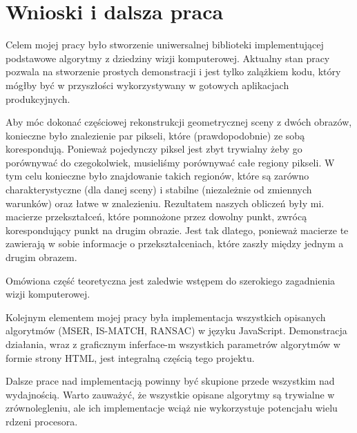 \chapter{Wnioski i dalsza praca}

Celem mojej pracy było stworzenie uniwersalnej biblioteki implementującej
podstawowe algorytmy z dziedziny wizji komputerowej. Aktualny stan pracy
pozwala na stworzenie prostych demonstracji i jest tylko zalążkiem kodu, który
mógłby być w przyszłości wykorzystywany w gotowych aplikacjach produkcyjnych.

Aby móc dokonać częściowej rekonstrukcji geometrycznej sceny z dwóch obrazów,
konieczne było znalezienie par pikseli, które (prawdopodobnie) ze sobą
korespondują. Ponieważ pojedynczy piksel jest zbyt trywialny żeby go porównywać
do czegokolwiek, musieliśmy porównywać całe regiony pikseli. W tym celu
konieczne było znajdowanie takich regionów, które są zarówno charakterystyczne
(dla danej sceny) i stabilne (niezależnie od zmiennych warunków) oraz łatwe w
znalezieniu. Rezultatem naszych obliczeń były mi. macierze przekształceń, które
pomnożone przez dowolny punkt, zwrócą korespondujący punkt na drugim obrazie.
Jest tak dlatego, ponieważ macierze te zawierają w sobie informacje o
przekształceniach, które zaszły między jednym a drugim obrazem.

Omówiona część teoretyczna jest zaledwie wstępem do szerokiego zagadnienia
wizji komputerowej.

Kolejnym elementem mojej pracy była implementacja wszystkich opisanych
algorytmów (MSER, IS-MATCH, RANSAC) w języku JavaScript. Demonstracja działania,
wraz z graficznym inferface-m wszystkich parametrów algorytmów w formie strony
HTML, jest integralną częścią tego projektu. 

Dalsze prace nad implementacją powinny być skupione przede wszystkim nad
wydajnością. Warto zauważyć, że wszystkie opisane algorytmy są trywialne w
zrównolegleniu, ale ich implementacje wciąż nie wykorzystuje potencjału wielu
rdzeni procesora.

